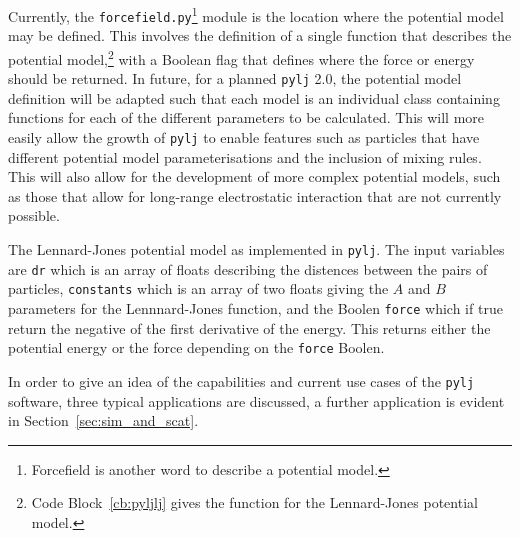 Currently, the \texttt{forcefield.py}\footnote{Forcefield is another word to describe a potential model.} module is the location where the potential model may be defined.
This involves the definition of a single function that describes the potential model,\footnote{Code Block~\ref{cb:pyljlj} gives the function for the Lennard-Jones potential model.} with a Boolean flag that defines where the force or energy should be returned.
In future, for a planned \texttt{pylj} \num{2.0}, the potential model definition will be adapted such that each model is an individual class containing functions for each of the different parameters to be calculated.
This will more easily allow the growth of \texttt{pylj} to enable features such as particles that have different potential model parameterisations and the inclusion of mixing rules.
This will also allow for the development of more complex potential models, such as those that allow for long-range electrostatic interaction that are not currently possible.
%
\begin{listing}[t]
    \centering
    \caption{The Lennard-Jones potential model as implemented in \texttt{pylj}. The input variables are \texttt{dr} which is an array of floats describing the distences between the pairs of particles, \texttt{constants} which is an array of two floats giving the $A$ and $B$ parameters for the Lennnard-Jones function, and the Boolen \texttt{force} which if true return the negative of the first derivative of the energy. This returns either the potential energy or the force depending on the \texttt{force} Boolen.}
    
    \label{cb:pyljlj}
\end{listing}
%

In order to give an idea of the capabilities and current use cases of the \texttt{pylj} software, three typical applications are discussed, a further application is evident in Section~\ref{sec:sim_and_scat}.

